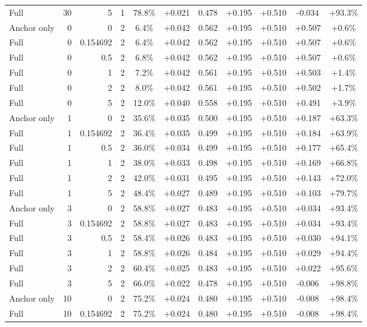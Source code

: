 \begin{table}[htbp]
\begin{tabular}{lrrrccccccc}
Full & 30 & 5 & 1 & 78.8\% & +0.021 & 0.478 & +0.195 & +0.510 & -0.034 & +93.3\% \\
Anchor only & 0 & 0 & 2 & 6.4\% & +0.042 & 0.562 & +0.195 & +0.510 & +0.507 & +0.6\% \\
Full & 0 & 0.154692 & 2 & 6.4\% & +0.042 & 0.562 & +0.195 & +0.510 & +0.507 & +0.6\% \\
Full & 0 & 0.5 & 2 & 6.8\% & +0.042 & 0.562 & +0.195 & +0.510 & +0.507 & +0.6\% \\
Full & 0 & 1 & 2 & 7.2\% & +0.042 & 0.561 & +0.195 & +0.510 & +0.503 & +1.4\% \\
Full & 0 & 2 & 2 & 8.0\% & +0.042 & 0.561 & +0.195 & +0.510 & +0.502 & +1.7\% \\
Full & 0 & 5 & 2 & 12.0\% & +0.040 & 0.558 & +0.195 & +0.510 & +0.491 & +3.9\% \\
Anchor only & 1 & 0 & 2 & 35.6\% & +0.035 & 0.500 & +0.195 & +0.510 & +0.187 & +63.3\% \\
Full & 1 & 0.154692 & 2 & 36.4\% & +0.035 & 0.499 & +0.195 & +0.510 & +0.184 & +63.9\% \\
Full & 1 & 0.5 & 2 & 36.0\% & +0.034 & 0.499 & +0.195 & +0.510 & +0.177 & +65.4\% \\
Full & 1 & 1 & 2 & 38.0\% & +0.033 & 0.498 & +0.195 & +0.510 & +0.169 & +66.8\% \\
Full & 1 & 2 & 2 & 42.0\% & +0.031 & 0.495 & +0.195 & +0.510 & +0.143 & +72.0\% \\
Full & 1 & 5 & 2 & 48.4\% & +0.027 & 0.489 & +0.195 & +0.510 & +0.103 & +79.7\% \\
Anchor only & 3 & 0 & 2 & 58.8\% & +0.027 & 0.483 & +0.195 & +0.510 & +0.034 & +93.4\% \\
Full & 3 & 0.154692 & 2 & 58.8\% & +0.027 & 0.483 & +0.195 & +0.510 & +0.034 & +93.4\% \\
Full & 3 & 0.5 & 2 & 58.4\% & +0.026 & 0.483 & +0.195 & +0.510 & +0.030 & +94.1\% \\
Full & 3 & 1 & 2 & 58.8\% & +0.026 & 0.484 & +0.195 & +0.510 & +0.029 & +94.4\% \\
Full & 3 & 2 & 2 & 60.4\% & +0.025 & 0.483 & +0.195 & +0.510 & +0.022 & +95.6\% \\
Full & 3 & 5 & 2 & 66.0\% & +0.022 & 0.478 & +0.195 & +0.510 & -0.006 & +98.8\% \\
Anchor only & 10 & 0 & 2 & 75.2\% & +0.024 & 0.480 & +0.195 & +0.510 & -0.008 & +98.4\% \\
Full & 10 & 0.154692 & 2 & 75.2\% & +0.024 & 0.480 & +0.195 & +0.510 & -0.008 & +98.4\% \\

\end{tabular}
\end{table}
